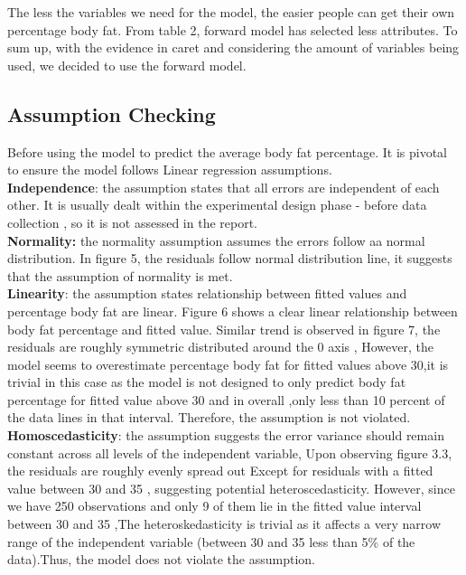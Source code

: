\documentclass[letterpaper,9pt,twocolumn,twoside,]{pinp}
\begin{document}
The less the variables we need for the model, the easier people can get
their own percentage body fat. From table 2, forward model has selected
less attributes. To sum up, with the evidence in caret and considering
the amount of variables being used, we decided to use the forward model.

\hypertarget{assumption-checking}{%
\subsection{Assumption Checking}\label{assumption-checking}}

Before using the model to predict the average body fat percentage. It is
pivotal to ensure the model follows Linear regression assumptions.\\
\textbf{Independence}: the assumption states that all errors are
independent of each other. It is usually dealt within the experimental
design phase - before data collection , so it is not assessed in the
report.\\
\textbf{Normality:} the normality assumption assumes the errors follow
aa normal distribution. In figure 5, the residuals follow normal
distribution line, it suggests that the assumption of normality is
met.\\
\textbf{Linearity}: the assumption states relationship between fitted
values and percentage body fat are linear. Figure 6 shows a clear linear
relationship between body fat percentage and fitted value. Similar trend
is observed in figure 7, the residuals are roughly symmetric distributed
around the 0 axis , However, the model seems to overestimate percentage
body fat for fitted values above 30,it is trivial in this case as the
model is not designed to only predict body fat percentage for fitted
value above 30 and in overall ,only less than 10 percent of the data
lines in that interval. Therefore, the assumption is not violated.\\
\textbf{Homoscedasticity}: the assumption suggests the error variance
should remain constant across all levels of the independent variable,
Upon observing figure 3.3, the residuals are roughly evenly spread out
Except for residuals with a fitted value between 30 and 35 , suggesting
potential heteroscedasticity. However, since we have 250 observations
and only 9 of them lie in the fitted value interval between 30 and 35
,The heteroskedasticity is trivial as it affects a very narrow range of
the independent variable (between 30 and 35 less than 5\% of the
data).Thus, the model does not violate the assumption.
\end{document}
